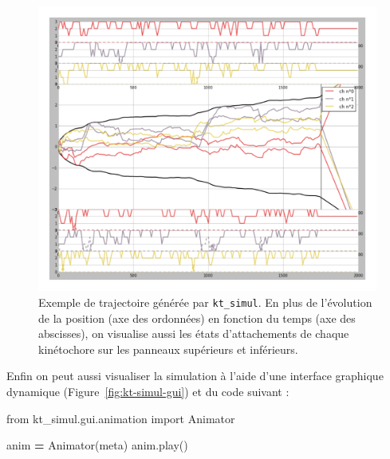 \documentclass[12pt,a4paper,twoside,openright]{book}
\newenvironment{Shaded}{\begin{snugshade}}{\end{snugshade}}
\newcommand{\ImportTok}[1]{{#1}}
\newcommand{\OperatorTok}[1]{\textcolor[rgb]{0.81,0.36,0.00}{\textbf{{#1}}}}
\newcommand{\NormalTok}[1]{{#1}}
\begin{document}
\begin{figure}[htbp]
\centering
\includegraphics{figures/annexes/trajectories.png}
\caption{\label{fig:kt-simul-traj}Exemple de trajectoire générée par
\texttt{kt\_simul}. En plus de l'évolution de la position (axe des
ordonnées) en fonction du temps (axe des abscisses), on visualise aussi
les états d'attachements de chaque kinétochore sur les panneaux
supérieurs et inférieurs.}
\end{figure}

Enfin on peut aussi visualiser la simulation à l'aide d'une interface
graphique dynamique (Figure~\ref{fig:kt-simul-gui}) et du code suivant :

\begin{Shaded}
\begin{Highlighting}[]
\ImportTok{from} \NormalTok{kt_simul.gui.animation }\ImportTok{import} \NormalTok{Animator}

\NormalTok{anim }\OperatorTok{=} \NormalTok{Animator(meta)}
\NormalTok{anim.play()}
\end{Highlighting}
\end{Shaded}
\end{document}

